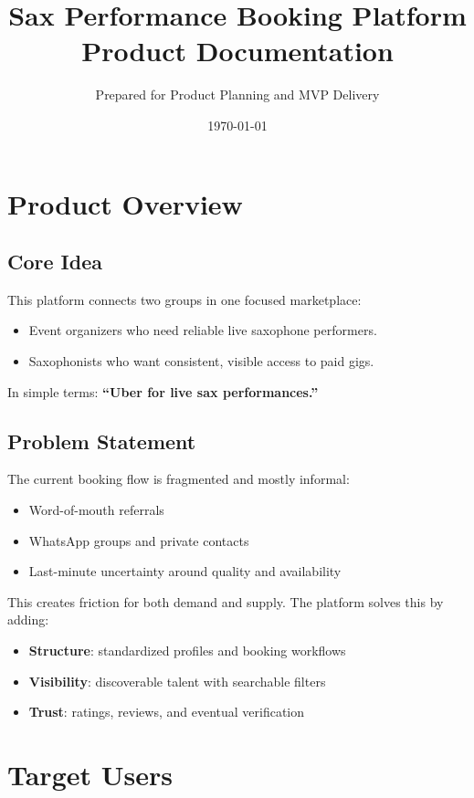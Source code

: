 \documentclass[11pt,a4paper]{article}
\title{\textbf{Sax Performance Booking Platform}\\Product Documentation}
\author{Prepared for Product Planning and MVP Delivery}
\date{\today}
\begin{document}
\maketitle
\tableofcontents
\newpage

\section{Product Overview}

\subsection{Core Idea}
This platform connects two groups in one focused marketplace:
\begin{itemize}[leftmargin=1.5em]
    \item Event organizers who need reliable live saxophone performers.
    \item Saxophonists who want consistent, visible access to paid gigs.
\end{itemize}

In simple terms: \textbf{``Uber for live sax performances.''}

\subsection{Problem Statement}
The current booking flow is fragmented and mostly informal:
\begin{itemize}[leftmargin=1.5em]
    \item Word-of-mouth referrals
    \item WhatsApp groups and private contacts
    \item Last-minute uncertainty around quality and availability
\end{itemize}

This creates friction for both demand and supply. The platform solves this by adding:
\begin{itemize}[leftmargin=1.5em]
    \item \textbf{Structure}: standardized profiles and booking workflows
    \item \textbf{Visibility}: discoverable talent with searchable filters
    \item \textbf{Trust}: ratings, reviews, and eventual verification
\end{itemize}

\section{Target Users}
\end{document}
